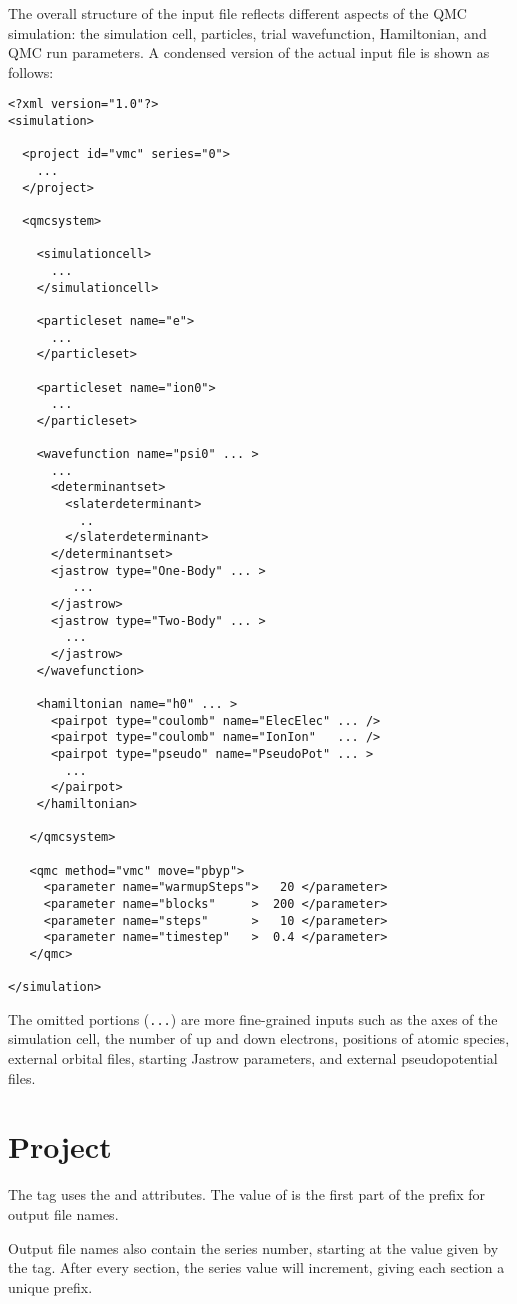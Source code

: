 The overall structure of the input file reflects different aspects of the QMC simulation: the simulation cell, particles, trial wavefunction, Hamiltonian, and QMC run parameters.  A condensed version of the actual input file is shown as follows:
\begin{lstlisting}[style=QMCPXML]
<?xml version="1.0"?>
<simulation>

  <project id="vmc" series="0">
    ...
  </project>

  <qmcsystem>

    <simulationcell>
      ...
    </simulationcell>

    <particleset name="e">
      ...
    </particleset>

    <particleset name="ion0">
      ...
    </particleset>

    <wavefunction name="psi0" ... >
      ...
      <determinantset>
        <slaterdeterminant>
          ..
        </slaterdeterminant>
      </determinantset>
      <jastrow type="One-Body" ... >
         ...
      </jastrow>
      <jastrow type="Two-Body" ... >
        ...
      </jastrow>
    </wavefunction>

    <hamiltonian name="h0" ... >
      <pairpot type="coulomb" name="ElecElec" ... />
      <pairpot type="coulomb" name="IonIon"   ... />
      <pairpot type="pseudo" name="PseudoPot" ... >
        ...
      </pairpot>
    </hamiltonian>

   </qmcsystem>

   <qmc method="vmc" move="pbyp">
     <parameter name="warmupSteps">   20 </parameter>
     <parameter name="blocks"     >  200 </parameter>
     <parameter name="steps"      >   10 </parameter>
     <parameter name="timestep"   >  0.4 </parameter>
   </qmc>

</simulation>
\end{lstlisting}
The omitted portions (\texttt{...}) are more fine-grained inputs such as the axes of the simulation cell, the number of up and down electrons, positions of atomic species, external orbital files, starting Jastrow parameters, and external pseudopotential files.  


\section{Project}
The  tag uses the  and  attributes.
The value of  is the first part of the prefix for output file names.

Output file names also contain the series number, starting at the value given by the
 tag.  After every  section, the series value will increment, giving each section a unique prefix.

